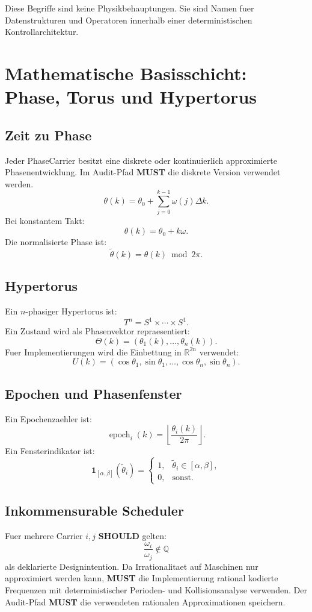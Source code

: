 \documentclass[11pt,a4paper]{article}
\newcommand{\MUST}{\textbf{MUST}}
\newcommand{\SHOULD}{\textbf{SHOULD}}
\begin{document}
Diese Begriffe sind keine Physikbehauptungen. Sie sind Namen fuer Datenstrukturen und Operatoren innerhalb einer deterministischen Kontrollarchitektur.

\section{Mathematische Basisschicht: Phase, Torus und Hypertorus}

\subsection{Zeit zu Phase}
Jeder PhaseCarrier besitzt eine diskrete oder kontinuierlich approximierte Phasenentwicklung. Im Audit-Pfad \MUST{} die diskrete Version verwendet werden.
\[
\theta(k) = \theta_0 + \sum_{j=0}^{k-1} \omega(j) \Delta k.
\]
Bei konstantem Takt:
\[
\theta(k) = \theta_0 + k \omega.
\]
Die normalisierte Phase ist:
\[
\widetilde{\theta}(k) = \theta(k) \bmod 2\pi.
\]

\subsection{Hypertorus}
Ein \(n\)-phasiger Hypertorus ist:
\[
T^n = S^1 \times \cdots \times S^1.
\]
Ein Zustand wird als Phasenvektor repraesentiert:
\[
\Theta(k) = (\theta_1(k),\dots,\theta_n(k)).
\]
Fuer Implementierungen wird die Einbettung in \(\mathbb{R}^{2n}\) verwendet:
\[
U(k)=\left(\cos\theta_1,\sin\theta_1,\dots,\cos\theta_n,\sin\theta_n\right).
\]

\subsection{Epochen und Phasenfenster}
Ein Epochenzaehler ist:
\[
\operatorname{epoch}_i(k)=\left\lfloor\frac{\theta_i(k)}{2\pi}\right\rfloor.
\]
Ein Fensterindikator ist:
\[
\mathbf{1}_{[\alpha,\beta]}(\widetilde{\theta}_i)=
\begin{cases}
1, & \widetilde{\theta}_i \in [\alpha,\beta],\\
0, & \text{sonst.}
\end{cases}
\]

\subsection{Inkommensurable Scheduler}
Fuer mehrere Carrier \(i,j\) \SHOULD{} gelten:
\[
\frac{\omega_i}{\omega_j}\notin \mathbb{Q}
\]
als deklarierte Designintention. Da Irrationalitaet auf Maschinen nur approximiert werden kann, \MUST{} die Implementierung rational kodierte Frequenzen mit deterministischer Perioden- und Kollisionsanalyse verwenden. Der Audit-Pfad \MUST{} die verwendeten rationalen Approximationen speichern.
\end{document}
